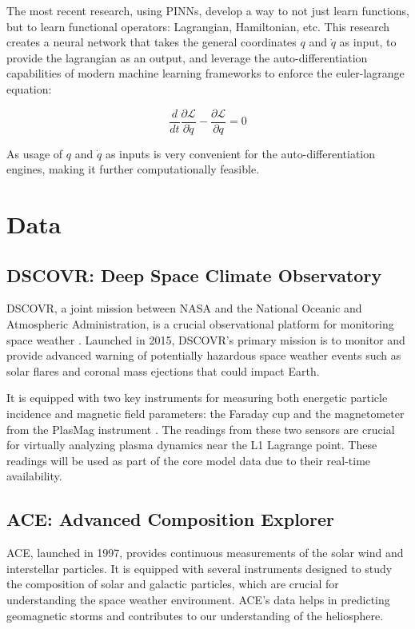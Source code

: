 \documentclass[12pt]{article}
\begin{document}
The most recent research, using PINNs, develop a way to not just learn functions, but to learn functional operators: Lagrangian, Hamiltonian, etc. This research \cite{} creates a neural network that takes the general coordinates $q$ and $\dot q$ as input, to provide the lagrangian as an output, and leverage the auto-differentiation capabilities of modern machine learning frameworks to enforce the euler-lagrange equation:

\begin{equation}
    \frac{d}{dt} \frac{\partial \mathcal{L}}{\partial \dot q} - \frac{\partial \mathcal{L}}{\partial q} = 0
\end{equation}

As usage of $q$ and $\dot q$ as inputs is very convenient for the auto-differentiation engines, making it further computationally feasible.

\section{Data}

\subsection{DSCOVR: Deep Space Climate Observatory}
DSCOVR, a joint mission between NASA and the National Oceanic and Atmospheric Administration, is a crucial observational platform for monitoring space weather \cite{nasa_dscovr}. Launched in 2015, DSCOVR's primary mission is to monitor and provide advanced warning of potentially hazardous space weather events such as solar flares and coronal mass ejections that could impact Earth.

It is equipped with two key instruments for measuring both energetic particle incidence and magnetic field parameters: the Faraday cup and the magnetometer from the PlasMag instrument \cite{nasa_dscovr}. The readings from these two sensors are crucial for virtually analyzing plasma dynamics near the L1 Lagrange point. These readings will be used as part of the core model data due to their real-time availability.

\subsection{ACE: Advanced Composition Explorer}
ACE, launched in 1997, provides continuous measurements of the solar wind and interstellar particles. It is equipped with several instruments designed to study the composition of solar and galactic particles, which are crucial for understanding the space weather environment. ACE's data helps in predicting geomagnetic storms and contributes to our understanding of the heliosphere.
\end{document}
